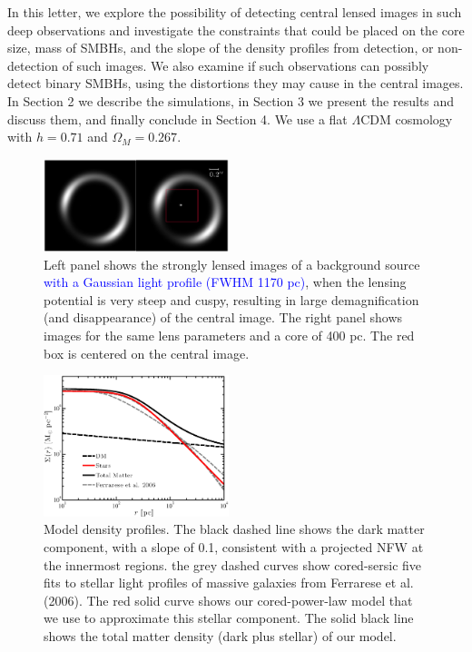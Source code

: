 \documentclass[chicago]{emulateapj}
\newcommand{\blue}{\textcolor{blue}}
\begin{document}
 In this letter, we explore the possibility of detecting central lensed images in such deep observations and investigate the constraints that could be placed on the core size, mass of SMBHs, and the slope of the density profiles from detection, or non-detection of such images. We also examine if 
 such observations can possibly detect binary SMBHs, using the distortions they may cause in the central images. 
 In Section 2 we describe the simulations, in Section 3 we present the results and discuss them, and finally conclude in Section 4. We use a flat $\Lambda$CDM cosmology with $h=0.71$ and $\Omega_M=0.267$.
 

\begin{figure}
\begin{center}
\centering
\includegraphics[trim= 10 0 0 0, clip, width=0.48\textwidth]{figures/f_02.eps}
\centering
\end{center}
\caption{ Left panel shows the strongly lensed images of a background source \blue{with a Gaussian light profile (FWHM 1170 pc)}, when the lensing potential is very steep and cuspy, resulting in large demagnification (and disappearance) of the central image.  The right panel shows images for the same lens parameters and a core of 400 pc. The red box is centered on the  central image.
\label{fig1}}
\end{figure}

\begin{figure}
\begin{center}
\centering
\includegraphics[trim= 0 0 5 6, clip, width=0.48\textwidth]{figures/f_01.eps}
\centering
\end{center}
\vspace{-1mm}
\caption{ Model density profiles. The black dashed line shows the dark matter component, with a slope of 0.1, consistent with a projected NFW at the innermost regions. the grey dashed curves show cored-sersic five fits to stellar light profiles of massive galaxies from Ferrarese et al. (2006). The red solid curve shows our cored-power-law model that we use to approximate this stellar component. The solid black line shows the total matter density (dark plus stellar) of our model. 
\label{fig2}}
\vspace{-1.5mm}
\end{figure}
\end{document}
